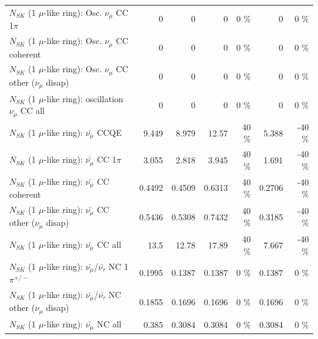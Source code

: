 \begin{table}
\begin{tabular}{| l | r | r | r  r | r  r |}
                          $N_{SK}$ (1 $\mu$-like ring): Osc. $\nu_\mu$ CC 1$\pi$ &               0 &               0 &               0 &        0 \%  &               0 &        0 \%  \\ 
                        $N_{SK}$ (1 $\mu$-like ring): Osc. $\nu_\mu$ CC coherent &               0 &               0 &               0 &        0 \%  &               0 &        0 \%  \\ 
         $N_{SK}$ (1 $\mu$-like ring): Osc. $\nu_\mu$ CC other ($\nu_\mu$ disap) &               0 &               0 &               0 &        0 \%  &               0 &        0 \%  \\ 
                      $N_{SK}$ (1 $\mu$-like ring): oscillation $\nu_\mu$ CC all &               0 &               0 &               0 &        0 \%  &               0 &        0 \%  \\ 
\hline
\hline
                              $N_{SK}$ (1 $\mu$-like ring): $\bar{\nu_\mu}$ CCQE &           9.449 &           8.979 &           12.57 &       40 \%  &           5.388 &      -40 \%  \\ 
                         $N_{SK}$ (1 $\mu$-like ring): $\bar{\nu_\mu}$ CC 1$\pi$ &           3.055 &           2.818 &           3.945 &       40 \%  &           1.691 &      -40 \%  \\ 
                       $N_{SK}$ (1 $\mu$-like ring): $\bar{\nu_\mu}$ CC coherent &          0.4492 &          0.4509 &          0.6313 &       40 \%  &          0.2706 &      -40 \%  \\ 
        $N_{SK}$ (1 $\mu$-like ring): $\bar{\nu_\mu}$ CC other ($\nu_\mu$ disap) &          0.5436 &          0.5308 &          0.7432 &       40 \%  &          0.3185 &      -40 \%  \\ 
                          $N_{SK}$ (1 $\mu$-like ring): $\bar{\nu_{\mu}}$ CC all &            13.5 &           12.78 &           17.89 &       40 \%  &           7.667 &      -40 \%  \\ 
\hline
  $N_{SK}$ (1 $\mu$-like ring): $\bar{\nu_\mu}$/$\bar{\nu_\tau}$ NC 1$\pi^{+/-}$ &          0.1995 &          0.1387 &          0.1387 &        0 \%  &          0.1387 &        0 \%  \\ 
$N_{SK}$ (1 $\mu$-like ring): $\bar{\nu_\mu}$/$\bar{\nu_\tau}$ NC other ($\nu_\mu$ disap) &          0.1855 &          0.1696 &          0.1696 &        0 \%  &          0.1696 &        0 \%  \\ 
                          $N_{SK}$ (1 $\mu$-like ring): $\bar{\nu_{\mu}}$ NC all &           0.385 &          0.3084 &          0.3084 &        0 \%  &          0.3084 &        0 \%  \\ 

\end{tabular}
\end{table}
